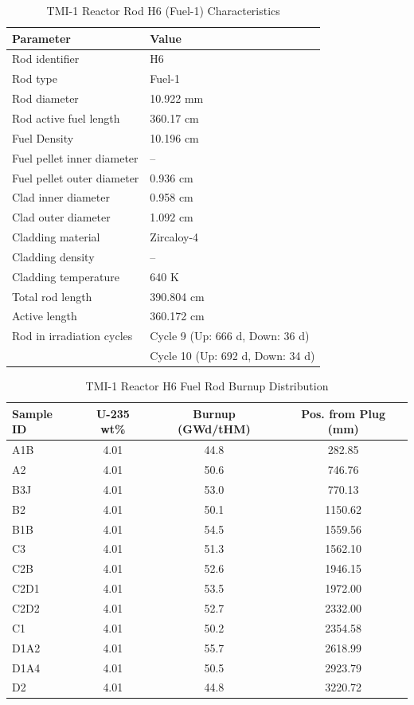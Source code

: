 \begin{table}[H]
\centering
\caption{TMI-1 Reactor Rod H6 (Fuel-1) Characteristics}
\begin{tabular}{ll}
\hline
\textbf{Parameter} & \textbf{Value} \\
\hline
Rod identifier & H6 \\
Rod type & Fuel-1 \\
Rod diameter & 10.922 mm \\
Rod active fuel length & 360.17 cm \\
Fuel Density & 10.196 cm \\
Fuel pellet inner diameter & -- \\
Fuel pellet outer diameter & 0.936 cm \\
Clad inner diameter & 0.958 cm \\
Clad outer diameter & 1.092 cm \\
Cladding material & Zircaloy-4 \\
Cladding density & -- \\
Cladding temperature & 640 K \\
Total rod length & 390.804 cm \\
Active length & 360.172 cm \\
Rod in irradiation cycles & Cycle 9 (Up: 666 d, Down: 36 d) \\
 & Cycle 10 (Up: 692 d, Down: 34 d) \\
\hline
\end{tabular}
\label{tab:tmi1_rod_characteristics}
\end{table}

\begin{table}[H]
\centering
\caption{TMI-1 Reactor H6 Fuel Rod Burnup Distribution}
\small
\begin{tabular}{lccc}
\hline
\textbf{Sample ID} & \textbf{U-235 wt\%} & \textbf{Burnup (GWd/tHM)} & \textbf{Pos. from Plug (mm)} \\
\hline
A1B & 4.01 & 44.8 & 282.85 \\
A2 & 4.01 & 50.6 & 746.76 \\
B3J & 4.01 & 53.0 & 770.13 \\
B2 & 4.01 & 50.1 & 1150.62 \\
B1B & 4.01 & 54.5 & 1559.56 \\
C3 & 4.01 & 51.3 & 1562.10 \\
C2B & 4.01 & 52.6 & 1946.15 \\
C2D1 & 4.01 & 53.5 & 1972.00 \\
C2D2 & 4.01 & 52.7 & 2332.00 \\
C1 & 4.01 & 50.2 & 2354.58 \\
D1A2 & 4.01 & 55.7 & 2618.99 \\
D1A4 & 4.01 & 50.5 & 2923.79 \\
D2 & 4.01 & 44.8 & 3220.72 \\
\hline
\end{tabular}
\label{tab:tmi1_burnup_distribution}
\end{table}